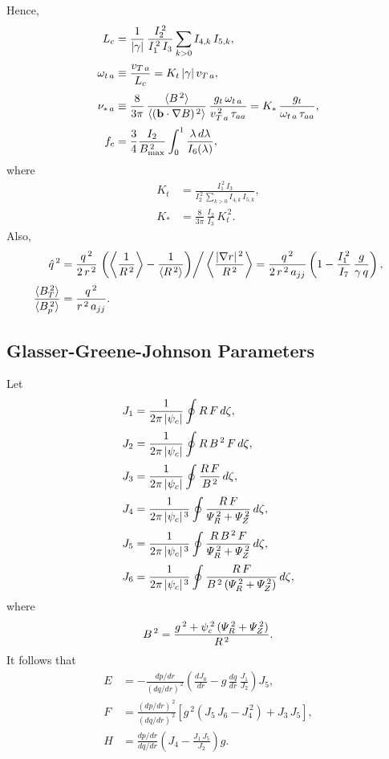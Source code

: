 \documentclass[12pt]{article}
\begin{document}
Hence,
\begin{align}
L_c &= \frac{1}{|\gamma|}\,\frac{I_2^{\,2}}{I_1^{\,2}\,I_3}\sum_{k>0}
I_{4,k}\,I_{5,k},\\[0.5ex]
\omega_{t\,a}&\equiv \frac{v_{T\,a}}{L_c} = K_{t}\,|\gamma|\,v_{T\,a},\\[0.5ex]
\nu_{\ast\,a} &\equiv \frac{8}{3\pi}\,\frac{\langle B^{\,2}\rangle}{\langle
({\bf b}\cdot\nabla B)^{\,2}\rangle}\,\frac{g_t\,\omega_{t\,a}}{v_{T\,a}^{\,2}\,\tau_{aa}}= K_{\ast}\,\frac{g_t}{\omega_{t\,a}\,\tau_{aa}},\\[0.5ex]
f_c &=\frac{3}{4} \frac{I_2}{B_{\rm max}^{\,2}}\int_0^{1}\frac{\lambda\,d\lambda}{I_6(\lambda)},
\end{align}
where 
\begin{align}
K_{t} &= \frac{I_1^{\,2}\,I_3}{I_2^{\,2}\,\sum_{k>0}I_{4,k}\,I_{5,k}},\\[0.5ex]
K_{\ast}&= \frac{8}{3\pi}\,\frac{I_2}{I_3}\,K_{t}^{\,2}.
\end{align}
Also,
\begin{align}
\hat{q}^{\,2} &= \frac{q^{\,2}}{2\,r^{\,2}}\left.\left(\left\langle \frac{1}{R^{\,2}}\right\rangle - \frac{1}{\langle R^{\,2}\rangle}\right)\right/\left\langle\frac{|\nabla r|^{\,2}}{R^{\,2}}\right\rangle = \frac{q^{\,2}}{2\,r^{\,2}\,a_{jj}}\left(
1-\frac{I_1^{\,2}}{I_7}\,\frac{g}{\gamma\,q}\right),\\[0.5ex]
\frac{\langle B_T^{\,2}\rangle}{\langle B_p^{\,2}\rangle}&= \frac{q^{\,2}}{r^{\,2}\,a_{jj}}.
\end{align}

\subsection{Glasser-Greene-Johnson Parameters}
Let
\begin{align}
J_1 &= \frac{1}{2\pi\,|\psi_c|}\oint R\,F\,d\zeta,\\[0.5ex]
J_2 &= \frac{1}{2\pi\,|\psi_c|}\oint R\,B^{\,2}\,F\,d\zeta,\\[0.5ex]
J_3 &= \frac{1}{2\pi\,|\psi_c|}\oint \frac{R\,F}{B^{\,2}}\,d\zeta,\\[0.5ex]
J_4 &= \frac{1}{2\pi\,|\psi_c|^{\,3}}\oint \frac{R\,F}{{\mit\Psi}_R^{\,2}+{\mit\Psi}_Z^{\,2}}\,d\zeta,\\[0.5ex]
J_5 &= \frac{1}{2\pi\,|\psi_c|^{\,3}}\oint \frac{R\,B^{\,2}\,F}{{\mit\Psi}_R^{\,2}+{\mit\Psi}_Z^{\,2}}\,d\zeta,\\[0.5ex]
J_6 &= \frac{1}{2\pi\,|\psi_c|^{\,3}}\oint \frac{R\,F}{B^{\,2}\,({\mit\Psi}_R^{\,2}+{\mit\Psi}_Z^{\,2})}\,d\zeta,
\end{align}
where 
\begin{equation}
B^{\,2} = \frac{g^{\,2} + \psi_c^{\,2}\,({\mit\Psi}_R^{\,2}+{\mit\Psi}_Z^{\,2})}{R^{\,2}}.
\end{equation}
It follows that
\begin{align}
E &= - \frac{dp/dr}{(dq/dr)^{\,2}}\left(\frac{dJ_0}{dr} - g\,\frac{dq}{dr}\,\frac{J_1}{J_2}\right)J_5,\\[0.5ex]
F&= \frac{(dp/dr)^{\,2}}{(dq/dr)^{\,2}}\left[g^{\,2}\left(J_5\,J_6-J_4^{\,2}\right)+ J_3\,J_5\right],\\[0.5ex]
H&= \frac{dp/dr}{dq/dr}\left(J_4- \frac{J_1\,J_5}{J_2}\right)g.
\end{align}
\end{document}
